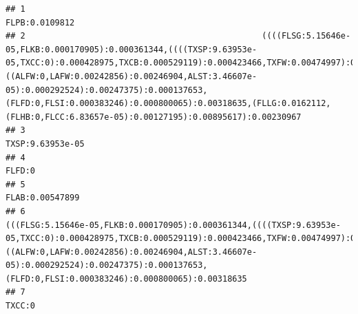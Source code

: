 \documentclass[]{article}
\begin{document}
\begin{verbatim}
## 1                                                                                                                                                                                                                                                                                                                                                                                                                  FLPB:0.0109812
## 2                                                ((((FLSG:5.15646e-05,FLKB:0.000170905):0.000361344,((((TXSP:9.63953e-05,TXCC:0):0.000428975,TXCB:0.000529119):0.000423466,TXFW:0.00474997):0.00280452,((ALFW:0,LAFW:0.00242856):0.00246904,ALST:3.46607e-05):0.000292524):0.00247375):0.000137653,(FLFD:0,FLSI:0.000383246):0.000800065):0.00318635,(FLLG:0.0162112,(FLHB:0,FLCC:6.83657e-05):0.00127195):0.00895617):0.00230967
## 3                                                                                                                                                                                                                                                                                                                                                                                                                TXSP:9.63953e-05
## 4                                                                                                                                                                                                                                                                                                                                                                                                                          FLFD:0
## 5                                                                                                                                                                                                                                                                                                                                                                                                                 FLAB:0.00547899
## 6                                                                                                                              (((FLSG:5.15646e-05,FLKB:0.000170905):0.000361344,((((TXSP:9.63953e-05,TXCC:0):0.000428975,TXCB:0.000529119):0.000423466,TXFW:0.00474997):0.00280452,((ALFW:0,LAFW:0.00242856):0.00246904,ALST:3.46607e-05):0.000292524):0.00247375):0.000137653,(FLFD:0,FLSI:0.000383246):0.000800065):0.00318635
## 7                                                                                                                                                                                                                                                                                                                                                                                                                          TXCC:0

\end{verbatim}
\end{document}
